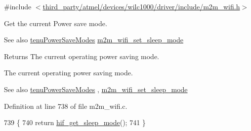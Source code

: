 {\ttfamily \#include $<$\hyperlink{m2m__wifi_8h}{third\+\_\+party/atmel/devices/wilc1000/driver/include/m2m\+\_\+wifi.\+h}$>$}



Get the current Power save mode. 

\begin{DoxySeeAlso}{See also}
\hyperlink{group__WlanEnums_gae6bd0ac78bfca4cda17d9dbedf79ad7e}{tenu\+Power\+Save\+Modes} \hyperlink{group__SetSleepModeFn_gaeea00cc2149c37ac91e2cb5882dadd14}{m2m\+\_\+wifi\+\_\+set\+\_\+sleep\+\_\+mode} 
\end{DoxySeeAlso}
\begin{DoxyReturn}{Returns}
The current operating power saving mode.

The current operating power saving mode. 
\end{DoxyReturn}
\begin{DoxySeeAlso}{See also}
\hyperlink{group__WlanEnums_gae6bd0ac78bfca4cda17d9dbedf79ad7e}{tenu\+Power\+Save\+Modes} , \hyperlink{group__SetSleepModeFn_gaeea00cc2149c37ac91e2cb5882dadd14}{m2m\+\_\+wifi\+\_\+set\+\_\+sleep\+\_\+mode} 
\end{DoxySeeAlso}


Definition at line 738 of file m2m\+\_\+wifi.\+c.


\begin{DoxyCode}
739 \{
740     \textcolor{keywordflow}{return} \hyperlink{m2m__hif_8c_ad32fe2e6813b9ecfdd54d200e498468c}{hif\_get\_sleep\_mode}();
741 \}
\end{DoxyCode}
